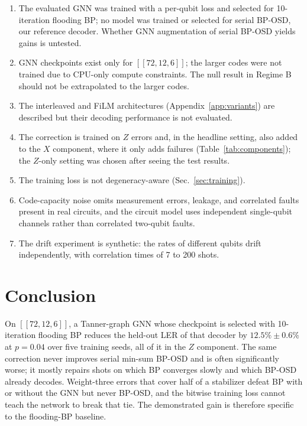 \documentclass[a4paper,twocolumn,11pt,nopdfoutputerror]{quantumarticle}
\newcommand{\code}[3]{\ensuremath{[\![#1,#2,#3]\!]}}
\begin{document}
\begin{enumerate}[leftmargin=*,topsep=3pt,itemsep=2pt,
                  label=(\roman*)]
\item The evaluated GNN was trained with a per-qubit loss and
      selected for 10-iteration flooding BP; no model was trained or
      selected for serial BP-OSD, our reference decoder. Whether GNN
      augmentation of serial BP-OSD yields gains is untested.
\item GNN checkpoints exist only for $\code{72}{12}{6}$; the
      larger codes were not trained due to CPU-only compute
      constraints. The null result in Regime B should not be
      extrapolated to the larger codes.
\item The interleaved and FiLM architectures
      (Appendix~\ref{app:variants}) are described but their decoding
      performance is not evaluated.
\item The correction is trained on $Z$ errors and, in the headline
      setting, also added to the $X$ component, where it only adds
      failures (Table~\ref{tab:components}); the $Z$-only setting was
      chosen after seeing the test results.
\item The training loss is not degeneracy-aware (Sec.~\ref{sec:training}).
\item Code-capacity noise omits measurement errors, leakage,
      and correlated faults present in real circuits, and the circuit
      model uses independent single-qubit channels rather than
      correlated two-qubit faults.
\item The drift experiment is synthetic: the rates of different qubits
      drift independently, with correlation times of 7 to 200 shots.
\end{enumerate}

\section{Conclusion}\label{sec:conclusion}

On $\code{72}{12}{6}$, a Tanner-graph GNN whose checkpoint is selected
with 10-iteration flooding BP reduces the held-out LER of that decoder by
$12.5\%\pm0.6\%$ at $p=0.04$ over five training seeds, all of it in the
$Z$ component. The same correction never improves serial min-sum BP-OSD
and is often significantly worse; it mostly repairs shots on which BP
converges slowly and which BP-OSD already decodes. Weight-three errors
that cover half of a stabilizer defeat BP with or without the GNN but
never BP-OSD, and the bitwise training loss cannot teach the network to
break that tie. The demonstrated gain is therefore specific to the
flooding-BP baseline.
\end{document}
